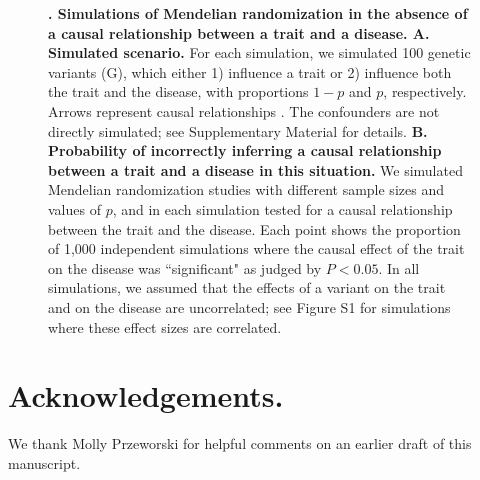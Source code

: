 \documentclass[11pt,titlepage]{article}
\begin{document}
\begin{figure}
\begin{center}
\caption{ \textbf{. Simulations of Mendelian randomization in the absence of a causal relationship between a trait and a disease. A. Simulated scenario.} For each simulation, we simulated 100 genetic variants (G), which either 1) influence a trait or 2) influence both the trait and the disease, with proportions $1-p$ and $p$, respectively. Arrows represent causal relationships \citep{pearl2000causality}. The confounders are not directly simulated; see Supplementary Material for details. \textbf{B. Probability of incorrectly inferring a causal relationship between a trait and a disease in this situation.} We simulated Mendelian randomization studies with different sample sizes and values of $p$, and in each simulation tested for a causal relationship between the trait and the disease. Each point shows the proportion of 1,000 independent simulations where the causal effect of the trait on the disease was ``significant" as judged by $P < 0.05$. In all simulations, we assumed that the effects of a variant on the trait and on the disease are uncorrelated; see Figure S1 for simulations where these effect sizes are correlated.}\label{f_sim}
\end{center}
\end{figure}

\clearpage

\section{Acknowledgements.} 
We thank Molly Przeworski for helpful comments on an earlier draft of this manuscript.


\end{document}
